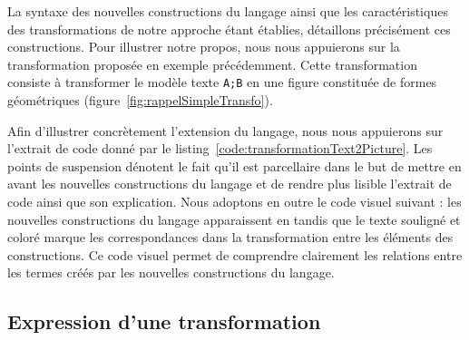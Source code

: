 La syntaxe des nouvelles constructions du langage ainsi que les
caractéristiques des transformations de notre approche étant établies,
détaillons précisément ces constructions. Pour illustrer notre propos, nous
nous appuierons sur la transformation proposée en exemple précédemment. Cette
transformation consiste à transformer le modèle texte \texttt{A;B} en une
figure constituée de formes géométriques
(figure~\ref{fig:rappelSimpleTransfo}). 

Afin d'illustrer concrètement l'extension du langage, nous nous appuierons sur
l'extrait de code donné par le listing~\ref{code:transformationText2Picture}.
Les points de suspension dénotent le fait qu'il est parcellaire dans le but de
mettre en avant les nouvelles constructions du langage et de rendre plus
lisible l'extrait de code ainsi que son explication. Nous adoptons en outre le
code visuel suivant : les nouvelles constructions du langage apparaissent en
 tandis que le texte souligné et coloré marque les
correspondances dans la transformation entre les éléments des constructions. Ce
code visuel permet de comprendre clairement les relations entre les termes
créés par les nouvelles constructions du langage.


\begin{figure}[h]
  \begin{center}
    
  \end{center}
\end{figure}

\FloatBarrier

\subsection{Expression d'une transformation}


